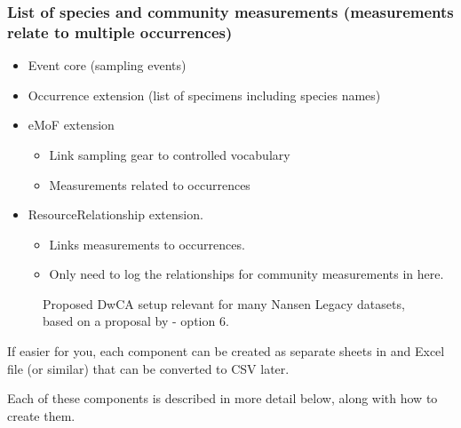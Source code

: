 \documentclass[a4paper,english, 11pt]{article}
\begin{document}
\subsubsection{List of species and community measurements (measurements relate to multiple occurrences)}
\label{ss:speciesmeasurementsmultipleoccurrence}

\begin{itemize}
\item Event core (sampling events)
\item Occurrence extension (list of specimens including species names)
\item eMoF extension
\begin{itemize}
\item Link sampling gear to controlled vocabulary
\item Measurements related to occurrences
\end{itemize}
\item ResourceRelationship extension.
\begin{itemize}
\item Links measurements to occurrences. 
\item Only need to log the relationships for community measurements in here. 
\end{itemize}
\end{itemize}  

\begin{figure}[h!tb]
    \caption{\label{fig:dwca_aen_eg4}
        Proposed DwCA setup relevant for many Nansen Legacy datasets, based on a proposal by \cite{de2017toward} - option 6.
    }
\end{figure}

If easier for you, each component can be created as separate sheets in and Excel file (or similar) that can be converted to CSV later.

Each of these components is described in more detail below, along with how to create them.
\end{document}
